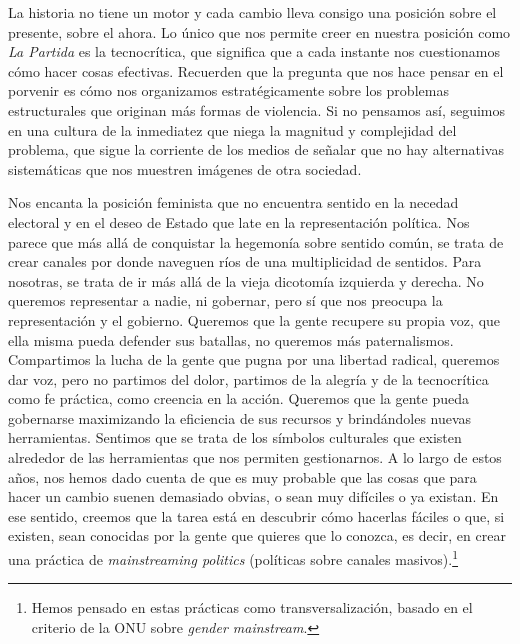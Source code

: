 La historia no tiene un motor y cada cambio lleva consigo una posición sobre el presente, sobre el ahora. Lo único que nos permite creer en nuestra posición como \emph{La Partida} es la tecnocrítica, que significa que a cada instante nos cuestionamos cómo hacer cosas efectivas. Recuerden que la pregunta que nos hace pensar en el porvenir es cómo nos organizamos estratégicamente sobre los problemas estructurales que originan más formas de violencia. Si no pensamos así, seguimos en una cultura de la inmediatez que niega la magnitud y complejidad del problema, que sigue la corriente de los medios de señalar que no hay alternativas sistemáticas que nos muestren imágenes de otra sociedad.

Nos encanta la posición feminista que no encuentra sentido en la necedad electoral y en el deseo de Estado que late en la representación política. Nos parece que más allá de conquistar la hegemonía sobre  sentido común, se trata de crear canales por donde naveguen ríos de una multiplicidad de sentidos. Para nosotras, se trata de ir más allá de la vieja dicotomía izquierda y derecha. No queremos representar a nadie, ni gobernar, pero sí que nos preocupa la representación y el gobierno. Queremos que la gente recupere su propia voz, que ella misma pueda defender sus batallas, no queremos más paternalismos. Compartimos la lucha de la gente que pugna por una libertad radical, queremos dar voz, pero no partimos del dolor, partimos de la alegría y de la tecnocrítica como fe práctica, como creencia en la acción. Queremos que la gente pueda gobernarse maximizando la eficiencia de sus recursos y brindándoles nuevas herramientas. Sentimos que se trata de  los símbolos culturales que existen alrededor de las herramientas que nos permiten gestionarnos. A lo largo de estos años, nos hemos dado cuenta de que es muy probable que las cosas que  para hacer un cambio suenen demasiado obvias, o sean muy difíciles o ya existan. En ese sentido, creemos que la tarea está en descubrir cómo hacerlas fáciles o que, si existen, sean conocidas por la gente que quieres que lo conozca, es decir, en crear una práctica de \emph{mainstreaming politics} (políticas sobre canales masivos).\footnote{Hemos pensado en estas prácticas como transversalización, basado en el criterio de la ONU sobre \emph{gender mainstream}.}\addref{}

